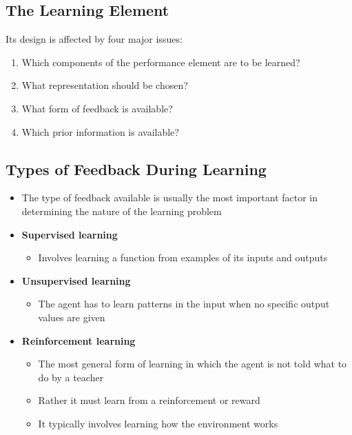 \documentclass[conference]{styles/acmsiggraph}
\begin{document}
    \subsection{The Learning Element}
        Its design is affected by four major issues:
        \begin{enumerate}
            \item Which components of the performance element are to be learned?
            \item What representation should be chosen?
            \item What form of feedback is available?
            \item Which prior information is available?
        \end{enumerate}
    
    \subsection{Types of Feedback During Learning}
        \begin{itemize}
            \item The type of feedback available is usually the most important factor in determining the nature of the learning problem
            \item \textbf{Supervised learning}
            \begin{itemize}
                \item Involves learning a function from examples of its inputs and outputs
            \end{itemize}
            \item \textbf{Unsupervised learning}
            \begin{itemize}
                \item The agent has to learn patterns in the input when no specific output values are given
            \end{itemize}
            \item \textbf{Reinforcement learning}
            \begin{itemize}
                \item The most general form of learning in which the agent is not told what to do by a teacher
                \item Rather it must learn from a reinforcement or reward
                \item It typically involves learning how the environment works
            \end{itemize}
        \end{itemize}
    
\end{document}
